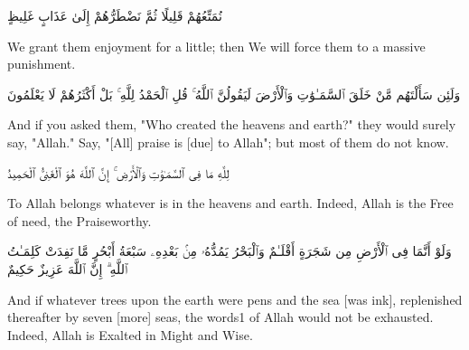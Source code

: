 \begin{edition*}
	\begin{Arabic}
		نُمَتِّعُهُمْ قَلِيلًا ثُمَّ نَضْطَرُّهُمْ إِلَىٰ عَذَابٍ غَلِيظٍ
	\end{Arabic}
\end{edition*}

\begin{translation}
	We grant them enjoyment for a little; then We will force them to a massive punishment.
\end{translation}


\begin{edition*}
	\begin{Arabic}
		وَلَئِن سَأَلْتَهُم مَّنْ خَلَقَ ٱلسَّمَـٰوَٰتِ وَٱلْأَرْضَ لَيَقُولُنَّ ٱللَّهُ ۚ قُلِ ٱلْحَمْدُ لِلَّهِ ۚ بَلْ أَكْثَرُهُمْ لَا يَعْلَمُونَ
	\end{Arabic}
\end{edition*}

\begin{translation}
	And if you asked them, "Who created the heavens and earth?" they would surely say, "Allah." Say, "[All] praise is [due] to Allah"; but most of them do not know.
\end{translation}


\begin{edition*}
	\begin{Arabic}
		لِلَّهِ مَا فِى ٱلسَّمَـٰوَٰتِ وَٱلْأَرْضِ ۚ إِنَّ ٱللَّهَ هُوَ ٱلْغَنِىُّ ٱلْحَمِيدُ
	\end{Arabic}
\end{edition*}

\begin{translation}
	To Allah belongs whatever is in the heavens and earth. Indeed, Allah is the Free of need, the Praiseworthy.
\end{translation}


\begin{edition*}
	\begin{Arabic}
		وَلَوْ أَنَّمَا فِى ٱلْأَرْضِ مِن شَجَرَةٍ أَقْلَـٰمٌ وَٱلْبَحْرُ يَمُدُّهُۥ مِنۢ بَعْدِهِۦ سَبْعَةُ أَبْحُرٍ مَّا نَفِدَتْ كَلِمَـٰتُ ٱللَّهِ ۗ إِنَّ ٱللَّهَ عَزِيزٌ حَكِيمٌ
	\end{Arabic}
\end{edition*}

\begin{translation}
	And if whatever trees upon the earth were pens and the sea [was ink], replenished thereafter by seven [more] seas, the words1 of Allah would not be exhausted. Indeed, Allah is Exalted in Might and Wise.
\end{translation}


